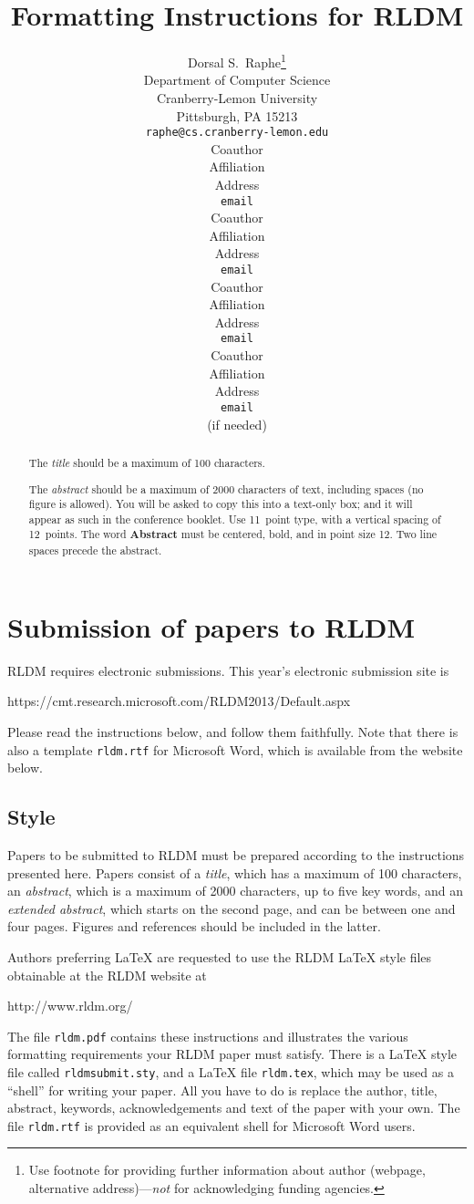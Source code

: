 \documentclass[11pt]{article} %
\title{Formatting Instructions for RLDM}
\author{
Dorsal S.~Raphe\thanks{ Use footnote for providing further information
about author (webpage, alternative address)---\emph{not} for acknowledging
funding agencies.} \\
Department of Computer Science\\
Cranberry-Lemon University\\
Pittsburgh, PA 15213 \\
\texttt{raphe@cs.cranberry-lemon.edu} \\
\And
Coauthor \\
Affiliation \\
Address \\
\texttt{email} \\
\AND
Coauthor \\
Affiliation \\
Address \\
\texttt{email} \\
\And
Coauthor \\
Affiliation \\
Address \\
\texttt{email} \\
\And
Coauthor \\
Affiliation \\
Address \\
\texttt{email} \\
(if needed)\\
}
\begin{document}
\maketitle

\begin{abstract}
The \emph{title} should be a maximum of 100 characters.

The \emph{abstract} should be a maximum of 2000 characters of text,
including spaces (no figure is allowed). You will be asked to copy
this into a text-only box; and it will appear as such in the
conference booklet. Use 11~point type, with a vertical spacing of
12~points.  The word \textbf{Abstract} must be centered, bold, and in
point size 12. Two line spaces precede the abstract.
\end{abstract}




\startmain %

\section{Submission of papers to RLDM}

RLDM requires electronic submissions.  This year's electronic
submission site is
\begin{center}
   https://cmt.research.microsoft.com/RLDM2013/Default.aspx
\end{center}

Please read the instructions below, and follow them faithfully. Note
that there is also a template \verb+rldm.rtf+ for Microsoft Word,
which is available from the website below.
\subsection{Style}

Papers to be submitted to RLDM must be prepared according to the
instructions presented here. Papers consist of a \emph{title}, which
has a maximum of 100 characters, an \emph{abstract}, which is a
maximum of 2000 characters, up to five key words, and an
\emph{extended abstract}, which starts on the second page, and can be
between one and four pages. Figures and references should be included
in the latter.

Authors preferring \LaTeX{} are requested to use the RLDM \LaTeX{}
style files obtainable at the RLDM website at
\begin{center}
   http://www.rldm.org/
\end{center}
The file \verb+rldm.pdf+ contains these instructions and illustrates
the various formatting requirements your RLDM paper must
satisfy. There is a \LaTeX{} style file called \verb+rldmsubmit.sty+,
and a \LaTeX{} file \verb+rldm.tex+, which may be used as a ``shell''
for writing your paper. All you have to do is replace the author,
title, abstract, keywords, acknowledgements and text of the paper with
your own. The file
\verb+rldm.rtf+ is provided as an equivalent shell for Microsoft Word users.
\end{document}
